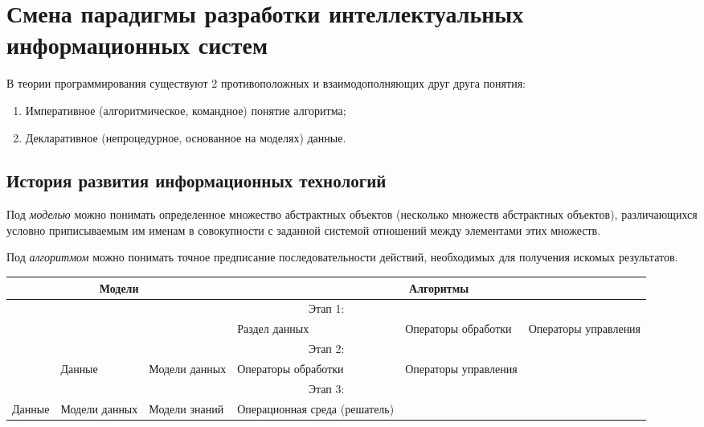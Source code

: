
\section{Смена парадигмы разработки интеллектуальных информационных систем}

В теории программирования существуют 2 противоположных и
взаимодополняющих друг друга понятия:
\begin{enumerate}
\item Императивное (алгоритмическое, командное) \textrightarrow{} понятие
  алгоритма;
\item Декларативное (непроцедурное, основанное на моделях)
  \textrightarrow{} данные.
\end{enumerate}

\subsection{История развития информационных технологий}

Под \emph{моделью} можно понимать определенное множество абстрактных объектов
(несколько множеств абстрактных объектов), различающихся условно
приписываемым им именам в совокупности с заданной системой отношений
между элементами этих множеств.

Под \emph{алгоритмом} можно понимать точное предписание
последовательности действий, необходимых для получения искомых результатов.

\begin{table}[ht]
  \centering

  \label{tab:stages}

  \begin{tabular}{|*{6}{m{.14\linewidth}|}}
    \multicolumn{3}{c|}{Модели} &
    \multicolumn{3}{c}{Алгоритмы}\\
    \hline
    \multicolumn{6}{c}{Этап 1:}\\ \cline{4-6}
    \multicolumn{3}{c|}{} & Раздел данных & Операторы обработки & Операторы управления\\ \cline{4-6}
    \multicolumn{6}{c}{Этап 2:}\\ 
    \cline{2-5}
    \multicolumn{1}{c|}{}&Данные & Модели данных & Операторы обработки & Операторы
    управления\\ \cline{2-5}
    \multicolumn{6}{c}{Этап 3:}\\ 
    \cline{1-4} Данные & Модели данных & Модели знаний & Опе\-ра\-ци\-он\-ная среда
    (решатель)\\ \cline{1-4}
  \end{tabular}
\end{table}


